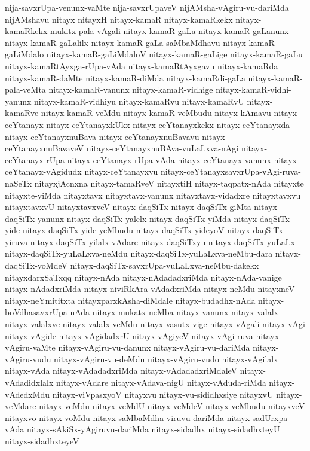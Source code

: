{nija-savxrUpa-venunx-vaMte
nija-savxrUpaveV
nijAMsha-vAgiru-vu-dariMda
nijAMshavu
nitayx
nitayxH
nitayx-kamaR
nitayx-kamaRkekx
nitayx-kamaRkekx-mukitx-pala-vAgali
nitayx-kamaR-gaLa
nitayx-kamaR-gaLanunx
nitayx-kamaR-gaLalilx
nitayx-kamaR-gaLa-saMbaMdhavu
nitayx-kamaR-gaLiMdalo
nitayx-kamaR-gaLiMdaloV
nitayx-kamaR-gaLige
nitayx-kamaR-gaLu
nitayx-kamaRtAyxga-rUpa-vAda
nitayx-kamaRtAyxgavu
nitayx-kamaRda
nitayx-kamaR-daMte
nitayx-kamaR-diMda
nitayx-kamaRdi-gaLa
nitayx-kamaR-pala-veMta
nitayx-kamaR-vanunx
nitayx-kamaR-vidhige
nitayx-kamaR-vidhi-yanunx
nitayx-kamaR-vidhiyu
nitayx-kamaRvu
nitayx-kamaRvU
nitayx-kamaRve
nitayx-kamaR-veMdu
nitayx-kamaR-veMbudu
nitayx-kAmavu
nitayx-ceYtanayx
nitayx-ceYtanayxkUkx
nitayx-ceYtanayxkekx
nitayx-ceYtanayxda
nitayx-ceYtanayxnuBava
nitayx-ceYtanayxnuBavavu
nitayx-ceYtanayxnuBavaveV
nitayx-ceYtanayxnuBAva-vuLaLxva-nAgi
nitayx-ceYtanayx-rUpa
nitayx-ceYtanayx-rUpa-vAda
nitayx-ceYtanayx-vanunx
nitayx-ceYtanayx-vAgidudx
nitayx-ceYtanayxvu
nitayx-ceYtanayxsavxrUpa-vAgi-ruva-naSeTx
nitayxjAcnxna
nitayx-tamaRveV
nitayxtiH
nitayx-taqpatx-nAda
nitayxte
nitayxte-yiMda
nitayxtavx
nitayxtavx-vanunx
nitayxtavx-vidadxre
nitayxtavxvu
nitayxtavxvU
nitayxtavxveV
nitayx-daqSiTx
nitayx-daqSiTx-giMta
nitayx-daqSiTx-yanunx
nitayx-daqSiTx-yalelx
nitayx-daqSiTx-yiMda
nitayx-daqSiTx-yide
nitayx-daqSiTx-yide-yeMbudu
nitayx-daqSiTx-yideyoV
nitayx-daqSiTx-yiruva
nitayx-daqSiTx-yilalx-vAdare
nitayx-daqSiTxyu
nitayx-daqSiTx-yuLaLx
nitayx-daqSiTx-yuLaLxva-neMdu
nitayx-daqSiTx-yuLaLxva-neMbu-dara
nitayx-daqSiTx-yoMdeV
nitayx-daqSiTx-savxrUpa-vuLaLxva-neMbu-dakekx
nitayxdarxSaTxqq
nitayx-nAda
nitayx-nAdadadxriMda
nitayx-nAda-vanige
nitayx-nAdadxriMda
nitayx-niviRkAra-vAdadxriMda
nitayx-neMdu
nitayxneV
nitayx-neYmititxta
nitayxparxkAsha-diMdale
nitayx-budadhx-nAda
nitayx-boVdhasavxrUpa-nAda
nitayx-mukatx-neMba
nitayx-vanunx
nitayx-valalx
nitayx-valalxve
nitayx-valalx-veMdu
nitayx-vasutx-vige
nitayx-vAgali
nitayx-vAgi
nitayx-vAgide
nitayx-vAgidadxrU
nitayx-vAgiyeV
nitayx-vAgi-ruva
nitayx-vAgiru-vaMte
nitayx-vAgiru-vu-danunx
nitayx-vAgiru-vu-dariMda
nitayx-vAgiru-vudu
nitayx-vAgiru-vu-deMdu
nitayx-vAgiru-vudo
nitayx-vAgilalx
nitayx-vAda
nitayx-vAdadadxriMda
nitayx-vAdadadxriMdaleV
nitayx-vAdadidxlalx
nitayx-vAdare
nitayx-vAdava-nigU
nitayx-vAduda-riMda
nitayx-vAdedxMdu
nitayx-viVpasxyoV
nitayxvu
nitayx-vu-sididhxsiye
nitayxvU
nitayx-veMdare
nitayx-veMdu
nitayx-veMdU
nitayx-veMdeV
nitayx-veMbudu
nitayxveV
nitayxvo
nitayx-voMdu
nitayx-saMbaMdha-viruvu-dariMda
nitayx-sadUrxpa-vAda
nitayx-sAkiSx-yAgiruvu-dariMda
nitayx-sidadhx
nitayx-sidadhxteyU
nitayx-sidadhxteyeV
}
